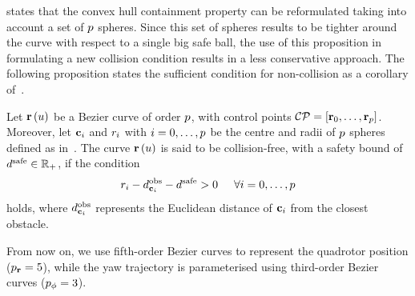  states that the convex hull containment property can be reformulated taking
into account a set of $p$ spheres. Since this set of spheres results to be tighter around the curve with respect to a single big
safe ball, the use of this proposition in formulating a new collision condition results in a less conservative approach.
The following proposition states the sufficient condition for non-collision as a corollary of~.
\begin{proposition}%
	\label{PROPOSITION:EXPLORATION-COLLISION-FREE}
	Let $\mathbf{r} \left( u \right)$ be a B\acuteacc ezier curve of order $p$, with control points $\mathcal{CP}= \left[ \mathbf{r}_0, \dots, \mathbf{r}_{p} \right]$.
	Moreover, let $\mathbf{c}_i$ and $r_i$ with $i=0,\dots,p$ be the centre and radii of $p$ spheres defined as
	in~. The curve $\mathbf{r} \left( u \right)$ is said to be collision-free,
	with a safety bound of $d^{\text{safe}} \in \mathbb{R}_{+}$, if the condition
	\begin{equation*}
		r_i - d^{\text{obs}}_{\mathbf{c}_i} - d^{\text{safe}} > 0 \hspace*{0.5cm} \forall i = 0, \dots, p
	\end{equation*}
	holds, where $d^{\text{obs}}_{\mathbf{c}_i}$ represents the Euclidean distance of $\mathbf{c}_i$ from the closest obstacle.
\end{proposition}
From now on, we use fifth-order B\acuteacc ezier curves to represent the quadrotor position ($p_{\mathbf{r}} = 5$),
while the yaw trajectory is parameterised using third-order B\acuteacc ezier curves ($p_{\phi} = 3$).

